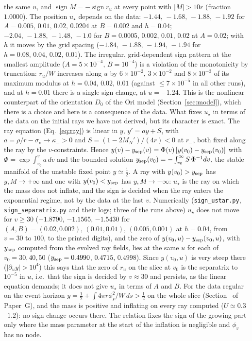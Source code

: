 \documentclass[11pt]{article}
\begin{document}
the same $u$, and $\operatorname{sign}M=-\operatorname{sign}r_u$ at every point with $|M|>10r$ (fraction $1.0000$). The position $u_\star$ depends on the data: $-1.44,\,-1.68,\,-1.88,\,-1.92$ for $A=0.005,\,0.01,\,0.02,\,0.0204$ at $B=0.002$ and $h=0.04$; $-2.04,\,-1.88,\,-1.48,\,-1.0$ for $B=0.0005,\,0.002,\,0.01,\,0.02$ at $A=0.02$; with $h$ it moves by the grid spacing ($-1.84,\,-1.88,\,-1.94,\,-1.94$ for $h=0.08,\,0.04,\,0.02,\,0.01$). The irregular, grid-dependent sign pattern at the smallest amplitude ($A=5\times10^{-4}$, $B=10^{-4}$) is a violation of the monotonicity by truncation: $r_u/W$ increases along $u$ by $6\times10^{-2}$, $3\times10^{-2}$ and $8\times10^{-3}$ of its maximum modulus at $h=0.04,\,0.02,\,0.01$ (against $\le7\times10^{-5}$ in all other runs), and at $h=0.01$ there is a single sign change, at $u=-1.24$. This is the nonlinear counterpart of the orientation $D_0$ of the Ori model (Section~\ref{sec:model}), which there is a choice and here is a consequence of the data. What fixes $u_\star$ in terms of the data on the initial rays we have not derived, but its character is exact. The ray equation (Eq.~\eqref{eq:ray}) is linear in $y$, $y'=ay+S$, with $a=\rho/r-\sigma_v\to\kappa_->0$ and $S=(1-2M_N')/(4r)<0$ at $r_-$, both fixed along the ray by the $v$-constraints. Hence $y(v)-y_{\rm sep}(v)=\Phi(v)\,[y(v_0)-y_{\rm sep}(v_0)]$ with $\Phi=\exp\int_{v_0}^va\,dv$ and the bounded solution $y_{\rm sep}(v_0)=-\int_{v_0}^\infty S\,\Phi^{-1}dv$, the stable manifold of the unstable fixed point $y\simeq\tfrac12$. A ray with $y(v_0)>y_{\rm sep}$ has $y,M\to+\infty$ and one with $y(v_0)<y_{\rm sep}$ has $y,M\to-\infty$: $u_\star$ is the ray on which the mass does not inflate, and the sign is decided when the ray enters the exponential regime, not by the data at the last $v$. Numerically (\texttt{sign\_ustar.py}, \texttt{sign\_separatrix.py} and their logs; three of the runs above) $u_\star$ does not move for $v\ge30$ ($-1.8790$, $-1.1565$, $-1.5430$ for $(A,B)=(0.02,0.002),\,(0.01,0.01),\,(0.005,0.001)$ at $h=0.04$, from $v=30$ to $100$, to the printed digits), and the zero of $y(v_0,u)-y_{\rm sep}(v_0,u)$, with $y_{\rm sep}$ computed from the evolved ray fields, lies at the same $u$ for each of $v_0=30,40,50$ ($y_{\rm sep}=0.4990$, $0.4715$, $0.4998$). Since $y(v_0,u)$ is very steep there ($|\partial_uy|>10^4$) this says that the zero of $r_u$ on the slice at $v_0$ is the separatrix to $10^{-5}$ in $u$, i.e.\ that the sign is decided by $v\approx30$ and persists, as the linear equation demands; it does not give $u_\star$ in terms of $A$ and $B$. For the data regular on the event horizon $y=\tfrac12+\int4\pi r\phi_s^2/W\,ds>\tfrac12$ on the whole slice (Section~\Grayn{} of Paper~G), and the mass is positive and inflating on every ray computed ($U\simeq0.3$--$1.2$): no sign change occurs there. The relation fixes the sign of the growing part only where the mass parameter at the start of the inflation is negligible and $\phi_v$ has no node.
\end{document}
